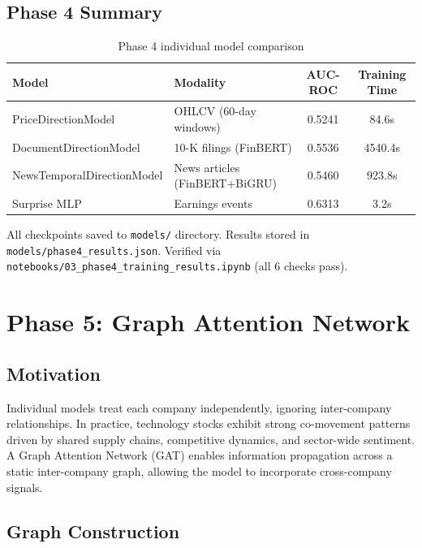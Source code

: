 \documentclass[12pt,a4paper]{article}
\begin{document}
\subsection{Phase 4 Summary}

\begin{table}[H]
\centering
\begin{tabular}{llcc}
\toprule
\textbf{Model} & \textbf{Modality} & \textbf{AUC-ROC} & \textbf{Training Time} \\
\midrule
PriceDirectionModel & OHLCV (60-day windows) & 0.5241 & 84.6s \\
DocumentDirectionModel & 10-K filings (FinBERT) & 0.5536 & 4540.4s \\
NewsTemporalDirectionModel & News articles (FinBERT+BiGRU) & 0.5460 & 923.8s \\
Surprise MLP & Earnings events & 0.6313 & 3.2s \\
\bottomrule
\end{tabular}
\caption{Phase 4 individual model comparison}
\label{tab:phase4_summary}
\end{table}

\noindent All checkpoints saved to \texttt{models/} directory. Results stored in \texttt{models/phase4\_results.json}. Verified via \texttt{notebooks/03\_phase4\_training\_results.ipynb} (all 6 checks pass).

\section{Phase 5: Graph Attention Network}
\label{sec:phase5}

\subsection{Motivation}

Individual models treat each company independently, ignoring inter-company relationships. In practice, technology stocks exhibit strong co-movement patterns driven by shared supply chains, competitive dynamics, and sector-wide sentiment. A Graph Attention Network (GAT) enables information propagation across a static inter-company graph, allowing the model to incorporate cross-company signals.

\subsection{Graph Construction}
\end{document}
